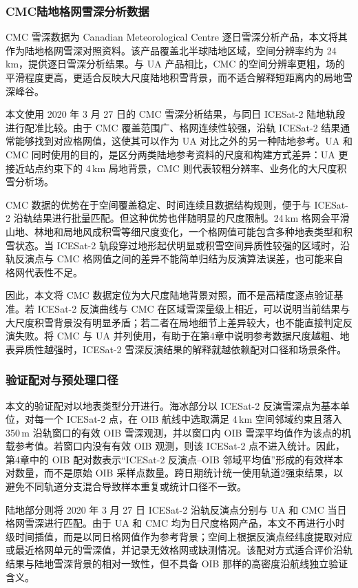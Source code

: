 \subsubsection{CMC陆地格网雪深分析数据}
CMC 雪深数据为 Canadian Meteorological Centre 逐日雪深分析产品，本文将其作为陆地格网雪深对照资料\citep{CMC_SnowDepth}。该产品覆盖北半球陆地区域，空间分辨率约为 24\,km，提供逐日雪深分析结果。与 UA 产品相比，CMC 的空间分辨率更粗，场的平滑程度更高，更适合反映大尺度陆地积雪背景，而不适合解释短距离内的局地雪深峰谷。

本文使用 2020 年 3 月 27 日的 CMC 雪深分析结果，与同日 ICESat-2 陆地轨段进行配准比较。由于 CMC 覆盖范围广、格网连续性较强，沿轨 ICESat-2 结果通常能够找到对应格网值，这使其可以作为 UA 对比之外的另一种陆地参考。UA 和 CMC 同时使用的目的，是区分两类陆地参考资料的尺度和构建方式差异：UA 更接近站点约束下的 4\,km 局地背景，CMC 则代表较粗分辨率、业务化的大尺度积雪分析场。

CMC 数据的优势在于空间覆盖稳定、时间连续且数据结构规则，便于与 ICESat-2 沿轨结果进行批量匹配。但这种优势也伴随明显的尺度限制。24\,km 格网会平滑山地、林地和局地风成积雪等细尺度变化，一个格网值可能包含多种地表类型和积雪状态。当 ICESat-2 轨段穿过地形起伏明显或积雪空间异质性较强的区域时，沿轨反演点与 CMC 格网值之间的差异不能简单归结为反演算法误差，也可能来自格网代表性不足。

因此，本文将 CMC 数据定位为大尺度陆地背景对照，而不是高精度逐点验证基准。若 ICESat-2 反演曲线与 CMC 在区域雪深量级上相近，可以说明当前结果与大尺度积雪背景没有明显矛盾；若二者在局地细节上差异较大，也不能直接判定反演失败。将 CMC 与 UA 并列使用，有助于在第4章中说明参考数据尺度越粗、地表异质性越强时，ICESat-2 雪深反演结果的解释就越依赖配对口径和场景条件。

\subsubsection{验证配对与预处理口径}
本文的验证配对以地表类型分开进行。海冰部分以 ICESat-2 反演雪深点为基本单位，对每一个 ICESat-2 点，在 OIB 航线中选取满足 4\,km 空间邻域约束且落入 350\,m 沿轨窗口的有效 OIB 雪深观测，并以窗口内 OIB 雪深平均值作为该点的机载参考值。若窗口内没有有效 OIB 观测，则该 ICESat-2 点不进入统计。因此，第4章中的 OIB 配对数表示``ICESat-2 反演点--OIB 邻域平均值''形成的有效样本对数量，而不是原始 OIB 采样点数量。跨日期统计统一使用轨道2强束结果，以避免不同轨道分支混合导致样本重复或统计口径不一致。

陆地部分则将 2020 年 3 月 27 日 ICESat-2 沿轨反演点分别与 UA 和 CMC 当日格网雪深进行匹配。由于 UA 和 CMC 均为日尺度格网产品，本文不再进行小时级时间插值，而是以同日格网值作为参考背景；空间上根据反演点经纬度提取对应或最近格网单元的雪深值，并记录无效格网或缺测情况。该配对方式适合评价沿轨结果与陆地雪深背景的相对一致性，但不具备 OIB 那样的高密度沿航线独立验证含义。

